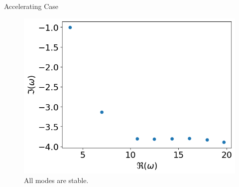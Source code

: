 \begin{frame}{Accelerating Case}
  \begin{figure} [H]
    \centering
    \includegraphics[width=0.7\linewidth]{figures/numerical-experiments/accelerating-v}
    \caption{All modes are stable.}
  \end{figure}
\end{frame}
